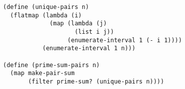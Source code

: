 \documentclass[a4paper,12pt]{article}
\begin{document}
\begin{lstlisting}
(define (unique-pairs n)
  (flatmap (lambda (i)
             (map (lambda (j)
                    (list i j))
                  (enumerate-interval 1 (- i 1))))
           (enumerate-interval 1 n)))

(define (prime-sum-pairs n)
  (map make-pair-sum
       (filter prime-sum? (unique-pairs n))))
\end{lstlisting}
\end{document}
